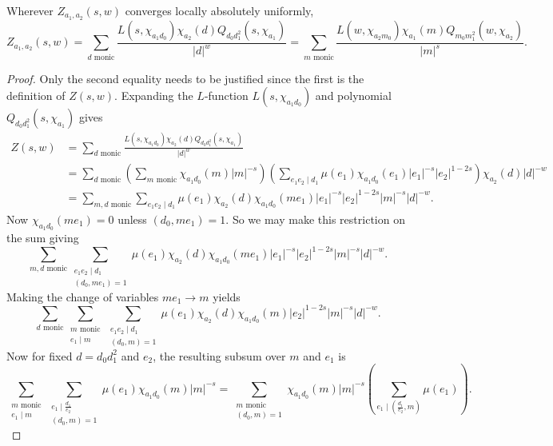 \documentclass[12pt,reqno,oneside]{amsart}
\begin{document}
    \begin{theorem}[Interchange]
        Wherever $Z_{a_{1},a_{2}}(s,w)$ converges locally absolutely uniformly,
        \[
            Z_{a_{1},a_{2}}(s,w) = \sum_{\text{$d$ monic}}\frac{L(s,\chi_{a_{1}d_{0}})\chi_{a_{2}}(d)Q_{d_{0}d_{1}^{2}}(s,\chi_{a_{1}})}{|d|^{w}} = \sum_{\text{$m$ monic}}\frac{L(w,\chi_{a_{2}m_{0}})\chi_{a_{1}}(m)Q_{m_{0}m_{1}^{2}}(w,\chi_{a_{2}})}{|m|^{s}}.
        \]
    \end{theorem}
    \begin{proof}
        Only the second equality needs to be justified since the first is the definition of $Z(s,w)$. Expanding the $L$-function $L(s,\chi_{a_{1}d_{0}})$ and polynomial $Q_{d_{0}d_{1}^{2}}(s,\chi_{a_{1}})$ gives
        \begin{align*}
            Z(s,w) &= \sum_{\text{$d$ monic}}\frac{L(s,\chi_{a_{1}d_{0}})\chi_{a_{2}}(d)Q_{d_{0}d_{1}^{2}}(s,\chi_{a_{1}})}{|d|^{w}} \\
            &= \sum_{\text{$d$ monic}}\left(\sum_{\text{$m$ monic}}\chi_{a_{1}d_{0}}(m)|m|^{-s}\right)\left(\sum_{e_{1}e_{2} \mid d_{1}}\mu(e_{1})\chi_{a_{1}d_{0}}(e_{1})|e_{1}|^{-s}|e_{2}|^{1-2s}\right)\chi_{a_{2}}(d)|d|^{-w} \\
            &= \sum_{\text{$m,d$ monic}}\sum_{e_{1}e_{2} \mid d_{1}}\mu(e_{1})\chi_{a_{2}}(d)\chi_{a_{1}d_{0}}(me_{1})|e_{1}|^{-s}|e_{2}|^{1-2s}|m|^{-s}|d|^{-w}.
        \end{align*}
        Now $\chi_{a_{1}d_{0}}(me_{1}) = 0$ unless $(d_{0},me_{1}) = 1$. So we may make this restriction on the sum giving
        \[
            \sum_{\text{$m,d$ monic}}\sum_{\substack{e_{1}e_{2} \mid d_{1} \\ (d_{0},me_{1}) = 1}}\mu(e_{1})\chi_{a_{2}}(d)\chi_{a_{1}d_{0}}(me_{1})|e_{1}|^{-s}|e_{2}|^{1-2s}|m|^{-s}|d|^{-w}.
        \]
        Making the change of variables $me_{1} \to m$ yields
        \[
            \sum_{\text{$d$ monic}}\sum_{\substack{\text{$m$ monic} \\ e_{1} \mid m}}\sum_{\substack{e_{1}e_{2} \mid d_{1} \\ (d_{0},m) = 1}}\mu(e_{1})\chi_{a_{2}}(d)\chi_{a_{1}d_{0}}(m)|e_{2}|^{1-2s}|m|^{-s}|d|^{-w}.
        \]
        Now for fixed $d = d_{0}d_{1}^{2}$ and $e_{2}$, the resulting subsum over $m$ and $e_{1}$ is
        \[
            \sum_{\substack{\text{$m$ monic} \\ e_{1} \mid m}}\sum_{\substack{e_{1} \mid \frac{d_{1}}{e_{2}} \\ (d_{0},m) = 1}}\mu(e_{1})\chi_{a_{1}d_{0}}(m)|m|^{-s} = \sum_{\substack{\text{$m$ monic} \\ (d_{0},m) = 1}}\chi_{a_{1}d_{0}}(m)|m|^{-s}\left(\sum_{e_{1} \mid \left(\frac{d_{1}}{e_{2}},m\right)}\mu(e_{1})\right).
\]
\end{proof}
\end{document}
